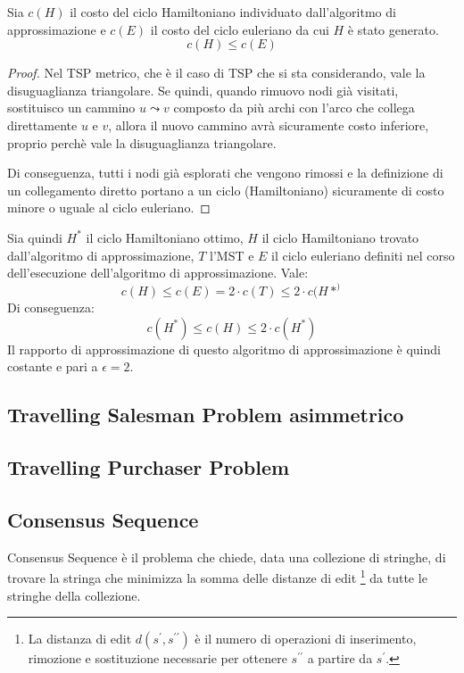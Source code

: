 \begin{thm}
    Sia $c(H)$ il costo del ciclo Hamiltoniano individuato dall'algoritmo di approssimazione e $c(E)$ il costo del ciclo euleriano da cui $H$ è stato generato.   \[
        c(H) \le c(E)
    \]
\end{thm}
\begin{proof}
    Nel TSP metrico, che è il caso di TSP che si sta considerando, vale la disuguaglianza triangolare.
    Se quindi, quando rimuovo nodi già visitati, sostituisco un cammino $u \leadsto v$ composto da più archi con l'arco che collega direttamente $u$ e $v$, allora il nuovo cammino avrà sicuramente costo inferiore, proprio perchè vale la disuguaglianza triangolare. 

    Di conseguenza, tutti i nodi già esplorati che vengono rimossi e la definizione di un collegamento diretto portano a un ciclo (Hamiltoniano) sicuramente di costo minore o uguale al ciclo euleriano.
\end{proof}

Sia quindi $H^*$ il ciclo Hamiltoniano ottimo, $H$ il ciclo Hamiltoniano trovato dall'algoritmo di approssimazione, $T$ l'MST e $E$ il ciclo euleriano definiti nel corso dell'esecuzione dell'algoritmo di approssimazione. Vale:
\[
    c(H) \le c(E) = 2 \cdot c(T) \le 2 \cdot c(H*^)
\]
Di conseguenza:
\[
    c(H^*) \le c(H) \le 2 \cdot c(H^*)
\]
Il rapporto di approssimazione di questo algoritmo di approssimazione è quindi costante e pari a $\epsilon = 2$.

\subsection*{Travelling Salesman Problem asimmetrico}

\subsection*{Travelling Purchaser Problem}

\subsection*{Consensus Sequence}
Consensus Sequence è il problema che chiede, data una collezione di stringhe, di trovare la stringa che minimizza la somma delle distanze di edit \footnote{La distanza di edit $d(s^{\prime}, s^{\prime\prime})$ è il numero di operazioni di inserimento, rimozione e sostituzione necessarie per ottenere $s^{\prime\prime}$ a partire da $s^{\prime}$.} da tutte le stringhe della collezione.

